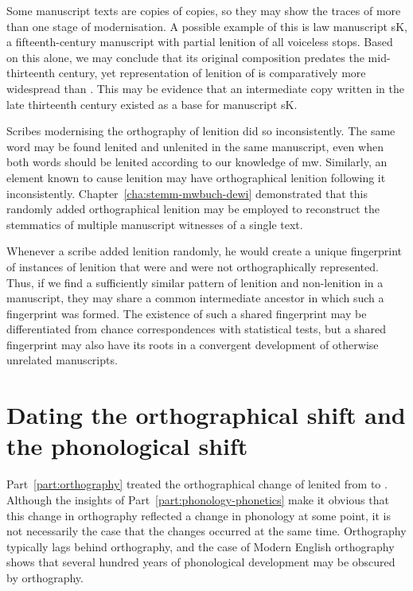 Some manuscript texts are copies of copies, so they may show the traces of more than one stage of modernisation. A possible example of this is law manuscript \gls{sK}, a fifteenth-century manuscript with partial lenition of all voiceless stops. Based on this alone, we may conclude that its original composition predates the mid-thirteenth century, yet representation of lenition of  is comparatively more widespread than . This may be evidence that an intermediate copy written in the late thirteenth century existed as a base for manuscript \gls{sK}.

Scribes modernising the orthography of lenition did so inconsistently. The same word may be found lenited and unlenited in the same manuscript, even when both words should be lenited according to our knowledge of \gls{mw}. Similarly, an element known to cause lenition may have orthographical lenition following it inconsistently. Chapter~\ref{cha:stemm-mwbuch-dewi} demonstrated that this randomly added orthographical lenition may be employed to reconstruct the stemmatics of multiple manuscript witnesses of a single text.

Whenever a scribe added lenition randomly, he would create a unique fingerprint of instances of lenition that were and were not orthographically represented. Thus, if we find a sufficiently similar pattern of lenition and non-lenition in a manuscript, they may share a common intermediate ancestor in which such a fingerprint was formed. The existence of such a shared fingerprint may be differentiated from chance correspondences with statistical tests, but a shared fingerprint may also have its roots in a convergent development of otherwise unrelated manuscripts.

\section{Dating the orthographical shift and the phonological shift}
\label{sec:change-lenition-as}

Part~\ref{part:orthography} treated the orthographical change of lenited  from  to . Although the insights of Part~\ref{part:phonology-phonetics} make it obvious that this change in orthography reflected a change in phonology at some point, it is not necessarily the case that the changes occurred at the same time. Orthography typically lags behind orthography, and the case of Modern English orthography shows that several hundred years of phonological development may be obscured by orthography.

